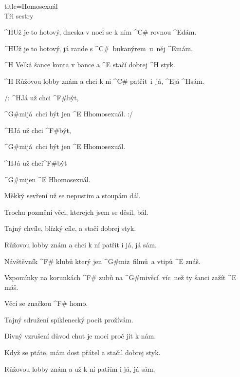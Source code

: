 \begin{song}{title=\predtitle\centering Homosexuál \\\large Tři sestry \vspace*{-0.3cm}}  %

\begin{centerjustified}
\velky

\sloka
	^{H}Už je to hotový, dneska v noci se k nim ^{C# \z}rovnou ^{E}dám.

	^{H}Už je to hotový, já rande s ^{\z C# \:\:\,}bukanýrem~u~něj ^{E}mám.

	^{H \z}Velká šance konta v bance a ^{E \z}stačí dobrej ^{H \z}styk.

	^{H \z}Růžovou lobby znám a chci k ni ^{\z C# \:}patřit~i~já, ^{E}já ^{H}sám.

	/: ^{H}Já už chci ^{F#}být,

	^{G#mi\z}já~chci být jen ^{E \z H}homosexuál. :/

	^{H}Já už chci ^{F#}být,

	^{G#mi\z}já~chci být jen ^{E \z H}homosexuál.

	^{H}Já už chci^{F#}být

	^{G#mi}jen ^{E \z H}homosexuál.

\sloka
	Měkký sevření už se nepustim a stoupám dál.

	Trochu pozmění věci, kterejch jsem se děsil, bál.

	Tajný chvíle, blízký cíle, a stačí dobrej styk.

	Růžovou lobby znám a chci k ní patřit i já, já sám.


	Návštěvník ^{F# \z}klubů který jen ^{G#mi}z~filmů~a vtipů ^{E \z}znáš.

	Vzpomínky na korunkách ^{F# \z}zubů na ^{G#mi}věcí~víc~než ty šanci zažít ^{E \,}máš.

	Věcí se značkou ^{F# \z}homo.

\sloka
	Tajný sdružení spiklenecký pocit prožívám.

	Divný vzrušení důvod chut je moci proč jít k nám.

	Když se ptáte, mám dost přátel a stačil dobrej styk.
	
	Růžovou lobby znám a už k ní patřím i já, já sám.


\end{centerjustified}
\setcounter{Slokočet}{0}
\end{song}
